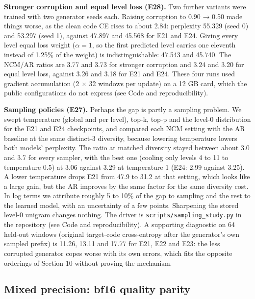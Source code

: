 \documentclass[
  british,
]{article}
\begin{document}
\textbf{Stronger corruption and equal level loss (E28).} Two further
variants were trained with two generator seeds each. Raising corruption
to 0.90 → 0.50 made things worse, as the clean code CE rises to about
2.84: perplexity 55.329 (seed 0) and 53.297 (seed 1), against 47.897 and
45.568 for E21 and E24. Giving every level equal loss weight
(\(\alpha = 1\), so the first predicted level carries one eleventh
instead of 1.25\% of the weight) is indistinguishable: 47.543 and
45.740. The NCM/AR ratios are 3.77 and 3.73 for stronger corruption and
3.24 and 3.20 for equal level loss, against 3.26 and 3.18 for E21 and
E24. These four runs used gradient accumulation (2 × 32 windows per
update) on a 12 GB card, which the public configurations do not express
(see Code and reproducibility).

\textbf{Sampling policies (E27).} Perhaps the gap is partly a sampling
problem. We swept temperature (global and per level), top-k, top-p and
the level-0 distribution for the E21 and E24 checkpoints, and compared
each NCM setting with the AR baseline at the same distinct-3 diversity,
because lowering temperature lowers both models' perplexity. The ratio
at matched diversity stayed between about 3.0 and 3.7 for every sampler,
with the best one (cooling only levels 4 to 11 to temperature 0.5) at
3.06 against 3.29 at temperature 1 (E24: 2.99 against 3.25). A lower
temperature drops E21 from 47.9 to 31.2 at that setting, which looks
like a large gain, but the AR improves by the same factor for the same
diversity cost. In log terms we attribute roughly 5 to 10\% of the gap
to sampling and the rest to the learned model, with an uncertainty of a
few points. Sharpening the stored level-0 unigram changes nothing. The
driver is \texttt{scripts/sampling\_study.py} in the repository (see
Code and reproducibility). A supporting diagnostic on 64 held-out
windows (original target-code cross-entropy after the generator's own
sampled prefix) is 11.26, 13.11 and 17.77 for E21, E22 and E23: the less
corrupted generator copes worse with its own errors, which fits the
opposite orderings of Section 10 without proving the mechanism.

\subsection{Mixed precision: bf16 quality
parity}\label{mixed-precision-bf16-quality-parity}
\end{document}
